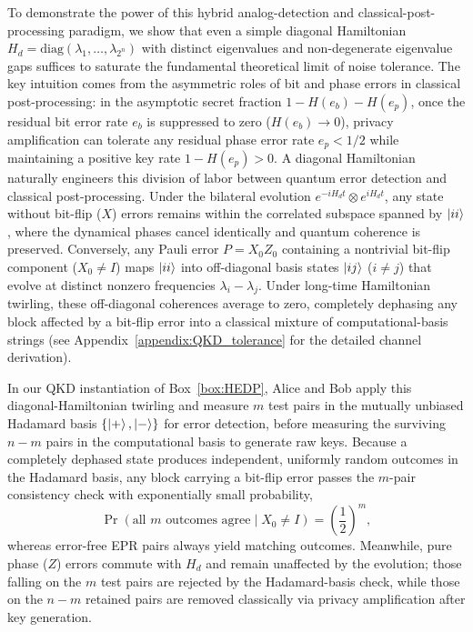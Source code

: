 \documentclass[onecolumn,prx,longbibliography,nofootinbib, superscriptaddress]{revtex4-2}
\theoremstyle{recap}
\begin{document}
To demonstrate the power of this hybrid analog-detection and classical-post-processing paradigm, we show that even a simple diagonal Hamiltonian $H_d=\mathrm{diag}(\lambda_1,\ldots,\lambda_{2^n})$ with distinct eigenvalues and non-degenerate eigenvalue gaps suffices to saturate the fundamental theoretical limit of noise tolerance. The key intuition comes from the asymmetric roles of bit and phase errors in classical post-processing: in the asymptotic secret fraction $1 - H(e_b) - H(e_p)$, once the residual bit error rate $e_b$ is suppressed to zero ($H(e_b)\to 0$), privacy amplification can tolerate any residual phase error rate $e_p < 1/2$ while maintaining a positive key rate $1 - H(e_p) > 0$. A diagonal Hamiltonian naturally engineers this division of labor between quantum error detection and classical post-processing. Under the bilateral evolution $e^{-iH_d t}\otimes e^{iH_d t}$, any state without bit-flip ($X$) errors remains within the correlated subspace spanned by $\ket{ii}$, where the dynamical phases cancel identically and quantum coherence is preserved. Conversely, any Pauli error $P=X_0 Z_0$ containing a nontrivial bit-flip component ($X_0 \neq I$) maps $\ket{ii}$ into off-diagonal basis states $\ket{ij}$ ($i\neq j$) that evolve at distinct nonzero frequencies $\lambda_i - \lambda_j$. Under long-time Hamiltonian twirling, these off-diagonal coherences average to zero, completely dephasing any block affected by a bit-flip error into a classical mixture of computational-basis strings (see Appendix~\ref{appendix:QKD_tolerance} for the detailed channel derivation).

In our QKD instantiation of Box~\ref{box:HEDP}, Alice and Bob apply this diagonal-Hamiltonian twirling and measure $m$ test pairs in the mutually unbiased Hadamard basis $\{\ket{+},\ket{-}\}$ for error detection, before measuring the surviving $n-m$ pairs in the computational basis to generate raw keys. Because a completely dephased state produces independent, uniformly random outcomes in the Hadamard basis, any block carrying a bit-flip error passes the $m$-pair consistency check with exponentially small probability,
\begin{equation}\label{eq:diagonal_bit_acceptance}
    \Pr(\text{all $m$ outcomes agree}\mid X_0\neq I)=\left(\frac{1}{2}\right)^m,
\end{equation}
whereas error-free EPR pairs always yield matching outcomes. Meanwhile, pure phase ($Z$) errors commute with $H_d$ and remain unaffected by the evolution; those falling on the $m$ test pairs are rejected by the Hadamard-basis check, while those on the $n-m$ retained pairs are removed classically via privacy amplification after key generation.
\end{document}
